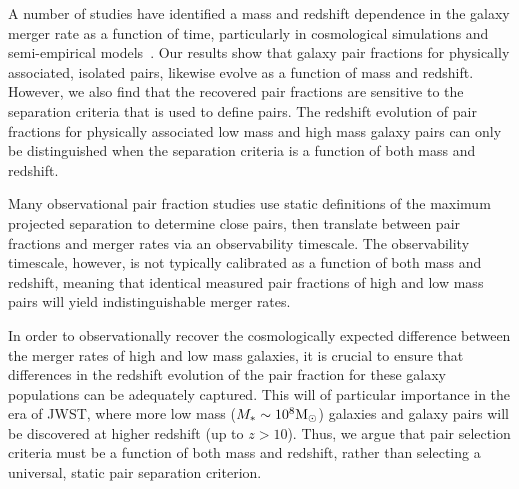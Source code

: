 \documentclass[twocolumn]{aastex631}
\begin{document}
    A number of studies have identified a mass and redshift dependence in the galaxy merger rate as a function of time, particularly in cosmological simulations and semi-empirical models~\cite[see e.g.][]{Stewart2009,Hopkins2010,RG2015}. 
    Our results show that galaxy pair fractions for physically associated, isolated pairs, likewise evolve as a function of mass and redshift. 
    However, we also find that the recovered pair fractions are sensitive to the separation criteria that is used to define pairs.
    The redshift evolution of pair fractions for physically associated low mass and high mass galaxy pairs can only be distinguished when the separation criteria is a function of both mass and redshift.

    Many observational pair fraction studies use static definitions of the maximum projected separation to determine close pairs, then translate between pair fractions and merger rates via an observability timescale. 
    The observability timescale, however, is not typically calibrated as a function of both mass and redshift, meaning that identical measured pair fractions of high and low mass pairs will yield indistinguishable merger rates. 

    In order to observationally recover the cosmologically expected difference between the merger rates of high and low mass galaxies, it is crucial to ensure that differences in the redshift evolution of the pair fraction for these galaxy populations can be adequately captured. 
    This will of particular importance in the era of JWST, where more low mass ($M_*\sim10^8 \mathrm{M}_\odot$) galaxies and galaxy pairs will be discovered at higher redshift (up to $z>10$). 
    Thus, we argue that pair selection criteria must be a function of both mass and redshift, rather than selecting a universal, static pair separation criterion.


{}

\end{document}
